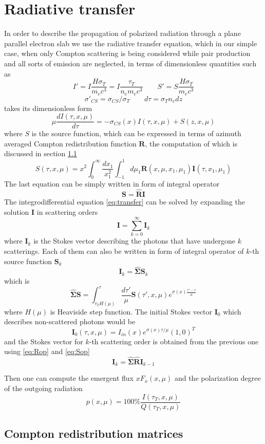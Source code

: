 \documentclass[iop, usenatbib]{emulateapj}
\newcommand{\be}{\begin{equation}}
\newcommand{\ee}{\end{equation}}
\begin{document}
\section{Radiative transfer}
In order to describe the propagation of polarized radiation through a plane parallel electron slab we use the radiative transfer equation, which in our  simple case, when only Compton scattering is being considered while pair production and all sorts of emission are neglected, in terms of dimensionless quantities such as $$
 I'=I \frac{H \sigma_T}{m_e c^3}=I \frac{\tau_T}{n_e m_e c^3} \qquad S'=S \frac{H \sigma_T}{m_e c^3}$$$$
\sigma'_{CS}=\sigma_{CS}/\sigma_T \qquad d\tau= \sigma_T n_e dz $$
takes its dimensionless form 
\be
\label{eq:transfer}
\mu \frac{d I (\tau,x,\mu)}{d\tau} = -  \sigma_{CS}(x)I(\tau,x,\mu) + S(z,x,\mu) 
\ee
where $S$ is the source function, which can be expressed in terms of azimuth averaged Compton redistribution function $\bm{R}$, the 
computation of which is discussed in section \ref{redistr} 
\be
\label{eq:Source}
S(\tau,x,\mu)= x^2 \int_0^\infty \frac{dx_1}{x_1^2} \int_{-1}^1 d\mu_1 
\bm{R}(x,\mu,x_1,\mu_1)\bm{I}(\tau,x_1,\mu_1)
\ee
The last equation can be simply written in form of integral operator
\be
\label{eq:Rop}
\bm{S}=\hat{\bm{R}}\bm{I}
\ee
 The integrodifferential equation \eqref{eq:transfer} can be solved by expanding the solution $\bm{I}$ in scattering orders
 \be
 \bm{I}=\sum_{k=0}^\infty \bm{I}_k
\ee
 where $\bm{I}_k$ is the Stokes vector describing the photons  that have undergone $k$ scatterings. Each of them can also be written in form of integral operator  of $k$-th source function $\bm{S}_k$
\be
\label{eq:Sop}
 \bm{I}_k=\hat{\bm{\Sigma}}\bm{S}_k
\ee
which is
 \be
 \hat{\bm{\Sigma}}\bm{S}=\int_{\tau_TH(\mu)}^\tau \frac{d\tau'}\mu \bm{S}(\tau',x,\mu) e^{\sigma(x)\frac{\tau'-\tau}\mu}
\ee 
where $H(\mu)$ is Heaviside step function. The initial Stokes vector $\bm{I}_0$ which describes non-scattered photons would be
\be
\bm{I}_0(\tau,x,\mu)=I_{in}(x) e^{\sigma(x)\tau/\mu} (1, 0)^T
\ee 
and the Stokes vector for $k$-th scattering order is obtained from the previous one using \eqref{eq:Rop} and \eqref{eq:Sop}
\be
\bm{I}_k=\hat{\bm{\Sigma}}\hat{\bm{R}}\bm{I}_{k-1}
\ee

Then one can compute the emergent flux $xF_x(x,\mu)$
and the polarization degree of the outgoing radiation
\be
p(x,\mu)=100\%\frac{I(\tau_T,x,\mu)}{Q(\tau_T,x,\mu)}
\ee



\subsection{Compton redistribution matrices} \label{redistr}
\end{document}
